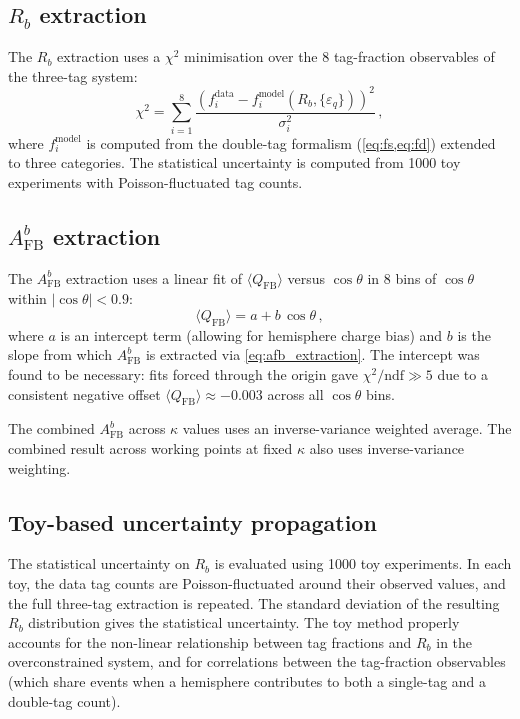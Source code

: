 \documentclass[11pt,a4paper]{article}
\begin{document}
\subsection{$R_b$ extraction}
\label{sec:stat-Rb}

The $R_b$ extraction uses a $\chi^2$ minimisation over the 8
tag-fraction observables of the three-tag system:
\begin{equation}
\chi^2 = \sum_{i=1}^{8}
  \frac{(f_i^\text{data} - f_i^\text{model}(R_b,
    \{\varepsilon_q\}))^2}{\sigma_i^2}\,,
\label{eq:chi2_rb}
\end{equation}
where $f_i^\text{model}$ is computed from the double-tag formalism
(\cref{eq:fs,eq:fd}) extended to three categories.
The statistical uncertainty is computed from 1000 toy experiments
with Poisson-fluctuated tag counts.

\subsection{$A_\text{FB}^b$ extraction}
\label{sec:stat-AFBb}

The $A_\text{FB}^b$ extraction uses a linear fit of
$\langle Q_\text{FB}\rangle$ versus $\cos\theta$ in 8 bins of
$\cos\theta$ within $|\cos\theta| < 0.9$:
\begin{equation}
\langle Q_\text{FB}\rangle = a + b\,\cos\theta\,,
\label{eq:qfb_fit}
\end{equation}
where $a$ is an intercept term (allowing for hemisphere charge
bias) and $b$ is the slope from which $A_\text{FB}^b$ is
extracted via \cref{eq:afb_extraction}.
The intercept was found to be necessary: fits forced through the
origin gave $\chi^2/\text{ndf} \gg 5$ due to a consistent
negative offset $\langle Q_\text{FB}\rangle \approx -0.003$
across all $\cos\theta$ bins.

The combined $A_\text{FB}^b$ across $\kappa$ values uses
an inverse-variance weighted average.
The combined result across working points at fixed $\kappa$
also uses inverse-variance weighting.

\subsection{Toy-based uncertainty propagation}
\label{sec:stat-toys}

The statistical uncertainty on $R_b$ is evaluated using 1000
toy experiments.
In each toy, the data tag counts are Poisson-fluctuated around
their observed values, and the full three-tag extraction is
repeated.
The standard deviation of the resulting $R_b$ distribution gives
the statistical uncertainty.
The toy method properly accounts for the non-linear relationship
between tag fractions and $R_b$ in the overconstrained system,
and for correlations between the tag-fraction observables
(which share events when a hemisphere contributes to both a
single-tag and a double-tag count).
\end{document}
